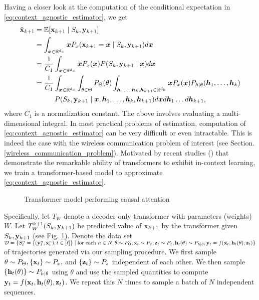 \documentclass[journal,letterpaper,onecolumn]{IEEEtran}
\begin{document}
Having a closer look at the computation of the conditional expectation in \ref{eq:context_agnostic_estimator}, we get
\begin{align*}
    \hat{{\mathbf{x}}}_{k+1} &= \mathbb{E}[{\mathbf{x}}_{k+1} \mid S_k, {\mathbf{y}}_{k+1}] \\
    &= \int_{{\bm{x}}\in {\mathbb{R}}^{d_x}} {\bm{x}} P_x( {\mathbf{x}}_{k+1} =  {\bm{x}} \mid S_k, {\mathbf{y}}_{k+1}) d{\bm{x}} \\
    &= \frac{1}{C_1} \int_{{\bm{x}}\in {\mathbb{R}}^{d_x}} {\bm{x}} P_x({\bm{x}}) P(S_k, {\mathbf{y}}_{k+1} \mid {\bm{x}}) d{\bm{x}} \\
    &= \frac{1}{C_1} \int_{{\bm{x}}\in {\mathbb{R}}^{d_x}} \int_{\theta \in \Theta} P_\Theta(\theta)\int_{{\bm{h}}_1, \dots, {\bm{h}}_k, {\bm{h}}_{k+1} \in{\mathbb{R}}^{d_h}} {\bm{x}} P_x({\bm{x}}) P_{h \mid \theta}({\bm{h}}_1, \dots, {\bm{h}}_k) \\
    &\hspace{1cm} P(S_k, {\mathbf{y}}_{k+1} \mid {\bm{x}}, {\bm{h}}_{1}, \dots, {\bm{h}}_k, {\bm{h}}_{k+1}) d{\bm{x}} d{\bm{h}}_1 \dots d{\bm{h}}_{k+1},
\end{align*}
where $C_1$ is a normalization constant. The above involves evaluating a multi-dimensional integral. In most practical problems of estimation, computation of \ref{eq:context_agnostic_estimator} can be very difficult or even intractable. This is indeed the case with the wireless communication problem of interest (see Section. \ref{wireless_communication_problem}). Motivated by recent studies (\cite{garg2023transformers,bartlett}) that demonstrate the remarkable ability of transformers to exhibit in-context learning, we train a transformer-based model to approximate \ref{eq:context_agnostic_estimator}.

\begin{figure}[ht]
\centering

\caption{Transformer model performing causal attention}
\label{fig:TransformerModel}
\end{figure}

Specifically, let $T_W$ denote a decoder-only transformer\cite{gpt2} with parameters (weights) $W$. Let $T^{k+1}_W(S_{k}, {\mathbf{y}}_{k+1})$ be predicted value of ${\mathbf{x}}_{k+1}$ by the transformer given $S_k, {\mathbf{y}}_{k+1}$ (see Fig. \ref{fig:TransformerModel}). Denote the data set $\mathcal{D}=\{ S_\ell^n = \{({\mathbf{y}}_t^n, {\mathbf{x}}_t^n), t\in[\ell]\} \mid {\rm for~each}~n\in N,  \theta \sim P_{\Theta}, {\mathbf{x}}_t \sim P_x, {\mathbf{z}}_t \sim P_z, {\mathbf{h}}_t(\theta) \sim P_{h \mid \theta}, {\mathbf{y}}_t = f({\mathbf{x}}_t, {\mathbf{h}}_t(\theta), {\mathbf{z}}_t)\}$ of trajectories generated via our sampling procedure. We first sample $\theta \sim P_{\Theta}, \{{\mathbf{x}}_t\} \sim P_x,$ and $\{{\mathbf{z}}_t\} \sim P_z$ independent of each other. We then sample $\{{\mathbf{h}}_t(\theta)\} \sim P_{h \mid \theta}$ using $\theta$ and use the sampled quantities to compute ${\mathbf{y}}_t = f({\mathbf{x}}_t, {\mathbf{h}}_t(\theta), {\mathbf{z}}_t)$. We repeat this $N$ times to sample a batch of $N$ independent sequences.
\end{document}

